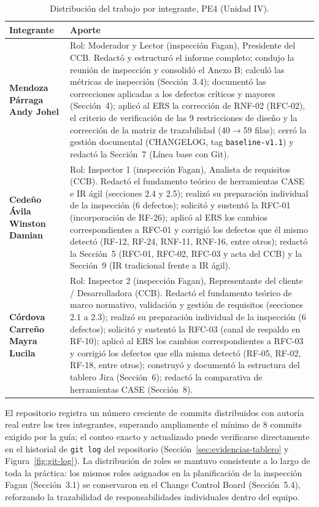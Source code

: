 \documentclass[journal,onecolumn]{IEEEtran}
\begin{document}
	\begin{table}[H]
		\centering
		\small
		\begin{tabularx}{\textwidth}{@{}l X@{}}
			\toprule
			\textbf{Integrante} & \textbf{Aporte} \\
			\midrule
			\textbf{Mendoza Párraga Andy Johel} & Rol: Moderador y Lector (inspección Fagan), Presidente del CCB. Redactó y estructuró el informe completo; condujo la reunión de inspección y consolidó el Anexo B; calculó las métricas de inspección (Sección~3.4); documentó las correcciones aplicadas a los defectos críticos y mayores (Sección~4); aplicó al ERS la corrección de RNF-02 (RFC-02), el criterio de verificación de las 9 restricciones de diseño y la corrección de la matriz de trazabilidad (40$\to$59 filas); cerró la gestión documental (CHANGELOG, tag \texttt{baseline-v1.1}) y redactó la Sección~7 (Línea base con Git). \\
			\textbf{Cedeño Ávila Winston Damian} & Rol: Inspector 1 (inspección Fagan), Analista de requisitos (CCB). Redactó el fundamento teórico de herramientas CASE e IR ágil (secciones 2.4 y 2.5); realizó su preparación individual de la inspección (6 defectos); solicitó y sustentó la RFC-01 (incorporación de RF-26); aplicó al ERS los cambios correspondientes a RFC-01 y corrigió los defectos que él mismo detectó (RF-12, RF-24, RNF-11, RNF-16, entre otros); redactó la Sección~5 (RFC-01, RFC-02, RFC-03 y acta del CCB) y la Sección~9 (IR tradicional frente a IR ágil). \\
			\textbf{Córdova Carreño Mayra Lucila} & Rol: Inspector 2 (inspección Fagan), Representante del cliente / Desarrolladora (CCB). Redactó el fundamento teórico de marco normativo, validación y gestión de requisitos (secciones 2.1 a 2.3); realizó su preparación individual de la inspección (6 defectos); solicitó y sustentó la RFC-03 (canal de respaldo en RF-10); aplicó al ERS los cambios correspondientes a RFC-03 y corrigió los defectos que ella misma detectó (RF-05, RF-02, RF-18, entre otros); construyó y documentó la estructura del tablero Jira (Sección~6); redactó la comparativa de herramientas CASE (Sección~8). \\
			\bottomrule
		\end{tabularx}
		\caption{Distribución del trabajo por integrante, PE4 (Unidad IV).}
		\label{tab:distribucion-trabajo}
	\end{table}
	
	El repositorio registra un número creciente de commits distribuidos con autoría real entre los tres integrantes, superando ampliamente el mínimo de 8 commits exigido por la guía; el conteo exacto y actualizado puede verificarse directamente en el historial de \texttt{git log} del repositorio (Sección~\ref{sec:evidencias-tablero} y Figura~\ref{fig:git-log}). La distribución de roles se mantuvo consistente a lo largo de toda la práctica: los mismos roles asignados en la planificación de la inspección Fagan (Sección~3.1) se conservaron en el Change Control Board (Sección~5.4), reforzando la trazabilidad de responsabilidades individuales dentro del equipo.
	\newpage
\end{document}
